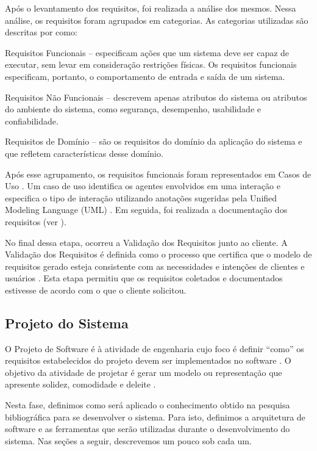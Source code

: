 Após o levantamento dos requisitos, foi realizada a análise dos mesmos. Nessa análise, os requisitos foram agrupados em categorias. As categorias utilizadas são descritas por 
 como:
\begin{alineascomponto}
    \item Requisitos Funcionais -- especificam ações que um sistema deve ser
capaz de executar, sem levar em consideração restrições físicas. Os requisitos
funcionais especificam, portanto, o comportamento de entrada e saída de um
sistema.
    \item Requisitos Não Funcionais -- descrevem apenas atributos do sistema ou
atributos do ambiente do sistema, como segurança, desempenho, usabilidade e
confiabilidade.
    \item Requisitos de Domínio -- são os requisitos do domínio da aplicação do sistema e que refletem características desse domínio.
\end{alineascomponto}

Após esse agrupamento, os requisitos funcionais foram representados em Casos de Uso \cite{jacobson92engenharia}. Um caso de uso identifica os agentes envolvidos em uma interação e especifica o tipo 
de interação utilizando anotações sugeridas pela Unified Modeling Language (UML) 
. Em seguida, foi realizada a documentação dos requisitos (ver ).

No final dessa etapa, ocorreu a Validação dos Requisitos junto ao cliente.  A Validação dos Requisitos é definida como o processo que certifica que o modelo de requisitos gerado  esteja  consistente  
com  as  necessidades  e  intenções  de  clientes  e usuários \cite{rilston2003metodologia}. Esta etapa permitiu que os requisitos coletados e documentados estivesse de acordo com o que o 
cliente solicitou.

\subsection{Projeto do Sistema}

O Projeto de Software é à atividade de engenharia cujo foco é definir ``como'' os requisitos estabelecidos do projeto devem ser implementados no software \cite{pressman2006engenharia}. O objetivo da  atividade de projetar é gerar um modelo ou representação que apresente solidez, comodidade e deleite \cite{pressman2006engenharia}. 

Nesta fase, definimos como será aplicado o conhecimento obtido na pesquisa bibliográfica para se desenvolver o sistema. Para isto, definimos a arquitetura de software e as ferramentas que serão utilizadas durante o desenvolvimento do sistema. Nas seções a seguir, descrevemos um pouco sob cada um.

